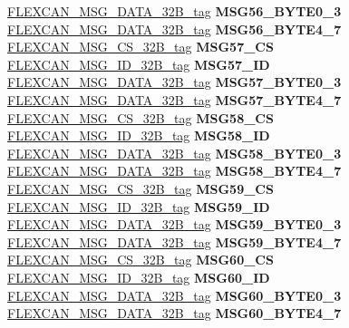 \begin{DoxyCompactItemize}
\begin{tabbing}
\>\>\mbox{\hyperlink{unionFLEXCAN__MSG__DATA__32B__tag}{FLEXCAN\_MSG\_DATA\_32B\_tag}} {\bfseries MSG56\_BYTE0\_3}\\
\>\>\mbox{\hyperlink{unionFLEXCAN__MSG__DATA__32B__tag}{FLEXCAN\_MSG\_DATA\_32B\_tag}} {\bfseries MSG56\_BYTE4\_7}\\
\>\>\mbox{\hyperlink{unionFLEXCAN__MSG__CS__32B__tag}{FLEXCAN\_MSG\_CS\_32B\_tag}} {\bfseries MSG57\_CS}\\
\>\>\mbox{\hyperlink{unionFLEXCAN__MSG__ID__32B__tag}{FLEXCAN\_MSG\_ID\_32B\_tag}} {\bfseries MSG57\_ID}\\
\>\>\mbox{\hyperlink{unionFLEXCAN__MSG__DATA__32B__tag}{FLEXCAN\_MSG\_DATA\_32B\_tag}} {\bfseries MSG57\_BYTE0\_3}\\
\>\>\mbox{\hyperlink{unionFLEXCAN__MSG__DATA__32B__tag}{FLEXCAN\_MSG\_DATA\_32B\_tag}} {\bfseries MSG57\_BYTE4\_7}\\
\>\>\mbox{\hyperlink{unionFLEXCAN__MSG__CS__32B__tag}{FLEXCAN\_MSG\_CS\_32B\_tag}} {\bfseries MSG58\_CS}\\
\>\>\mbox{\hyperlink{unionFLEXCAN__MSG__ID__32B__tag}{FLEXCAN\_MSG\_ID\_32B\_tag}} {\bfseries MSG58\_ID}\\
\>\>\mbox{\hyperlink{unionFLEXCAN__MSG__DATA__32B__tag}{FLEXCAN\_MSG\_DATA\_32B\_tag}} {\bfseries MSG58\_BYTE0\_3}\\
\>\>\mbox{\hyperlink{unionFLEXCAN__MSG__DATA__32B__tag}{FLEXCAN\_MSG\_DATA\_32B\_tag}} {\bfseries MSG58\_BYTE4\_7}\\
\>\>\mbox{\hyperlink{unionFLEXCAN__MSG__CS__32B__tag}{FLEXCAN\_MSG\_CS\_32B\_tag}} {\bfseries MSG59\_CS}\\
\>\>\mbox{\hyperlink{unionFLEXCAN__MSG__ID__32B__tag}{FLEXCAN\_MSG\_ID\_32B\_tag}} {\bfseries MSG59\_ID}\\
\>\>\mbox{\hyperlink{unionFLEXCAN__MSG__DATA__32B__tag}{FLEXCAN\_MSG\_DATA\_32B\_tag}} {\bfseries MSG59\_BYTE0\_3}\\
\>\>\mbox{\hyperlink{unionFLEXCAN__MSG__DATA__32B__tag}{FLEXCAN\_MSG\_DATA\_32B\_tag}} {\bfseries MSG59\_BYTE4\_7}\\
\>\>\mbox{\hyperlink{unionFLEXCAN__MSG__CS__32B__tag}{FLEXCAN\_MSG\_CS\_32B\_tag}} {\bfseries MSG60\_CS}\\
\>\>\mbox{\hyperlink{unionFLEXCAN__MSG__ID__32B__tag}{FLEXCAN\_MSG\_ID\_32B\_tag}} {\bfseries MSG60\_ID}\\
\>\>\mbox{\hyperlink{unionFLEXCAN__MSG__DATA__32B__tag}{FLEXCAN\_MSG\_DATA\_32B\_tag}} {\bfseries MSG60\_BYTE0\_3}\\
\>\>\mbox{\hyperlink{unionFLEXCAN__MSG__DATA__32B__tag}{FLEXCAN\_MSG\_DATA\_32B\_tag}} {\bfseries MSG60\_BYTE4\_7}\\

\end{tabbing}
\end{DoxyCompactItemize}
